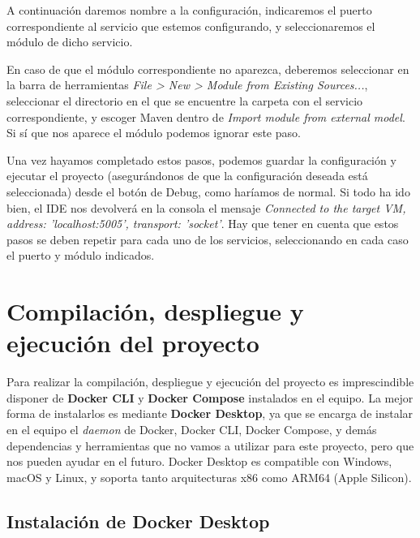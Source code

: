 
A continuación daremos nombre a la configuración, indicaremos el puerto correspondiente al servicio que estemos configurando, y seleccionaremos el módulo de dicho servicio.


En caso de que el módulo correspondiente no aparezca, deberemos seleccionar en la barra de herramientas \textit{File > New > Module from Existing Sources...}, seleccionar el directorio en el que se encuentre la carpeta con el servicio correspondiente, y escoger Maven dentro de \textit{Import module from external model}. Si sí que nos aparece el módulo podemos ignorar este paso.


Una vez hayamos completado estos pasos, podemos guardar la configuración y ejecutar el proyecto (asegurándonos de que la configuración deseada está seleccionada) desde el botón de Debug, como haríamos de normal. Si todo ha ido bien, el IDE nos devolverá en la consola el mensaje \textit{Connected to the target VM, address: 'localhost:5005', transport: 'socket'}. Hay que tener en cuenta que estos pasos se deben repetir para cada uno de los servicios, seleccionando en cada caso el puerto y módulo indicados.

\section{Compilación, despliegue y ejecución del proyecto}

Para realizar la compilación, despliegue y ejecución del proyecto es imprescindible disponer de \textbf{Docker CLI} y \textbf{Docker Compose} instalados en el equipo. La mejor forma de instalarlos es mediante \textbf{Docker Desktop}, ya que se encarga de instalar en el equipo el \textit{daemon} de Docker, Docker CLI, Docker Compose, y demás dependencias y herramientas que no vamos a utilizar para este proyecto, pero que nos pueden ayudar en el futuro. Docker Desktop es compatible con Windows, macOS y Linux, y soporta tanto arquitecturas x86 como ARM64 (Apple Silicon).

\subsection{Instalación de Docker Desktop}

